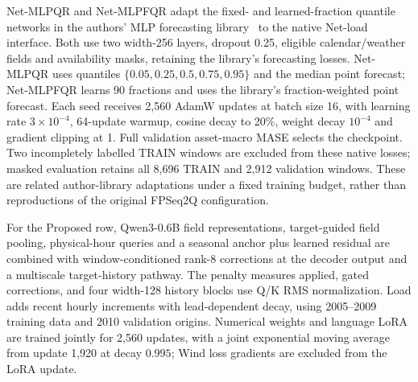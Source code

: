 \documentclass[journal]{IEEEtran}
\begin{document}
Net-MLPQR and Net-MLPFQR adapt the fixed- and learned-fraction quantile networks in the authors' MLP forecasting library~\cite{faustine2025efficiency,faustine2022fpseq2q,faustineMlpforecastCode} to the native Net-load interface. Both use two width-256 layers, dropout 0.25, eligible calendar/weather fields and availability masks, retaining the library's forecasting losses. Net-MLPQR uses quantiles $\{0.05,0.25,0.5,0.75,0.95\}$ and the median point forecast; Net-MLPFQR learns 90 fractions and uses the library's fraction-weighted point forecast. Each seed receives 2,560 AdamW updates at batch size 16, with learning rate $3\times10^{-4}$, 64-update warmup, cosine decay to 20\%, weight decay $10^{-4}$ and gradient clipping at 1. Full validation asset-macro MASE selects the checkpoint. Two incompletely labelled TRAIN windows are excluded from these native losses; masked evaluation retains all 8,696 TRAIN and 2,912 validation windows. These are related author-library adaptations under a fixed training budget, rather than reproductions of the original FPSeq2Q configuration.

For the Proposed row, Qwen3-0.6B field representations, target-guided field pooling, physical-hour queries and a seasonal anchor plus learned residual are combined with window-conditioned rank-8 corrections at the decoder output and a multiscale target-history pathway. The penalty measures applied, gated corrections, and four width-128 history blocks use Q/K RMS normalization. Load adds recent hourly increments with lead-dependent decay, using 2005--2009 training data and 2010 validation origins. Numerical weights and language LoRA are trained jointly for 2,560 updates, with a joint exponential moving average from update 1,920 at decay $0.995$; Wind loss gradients are excluded from the LoRA update.
\end{document}
